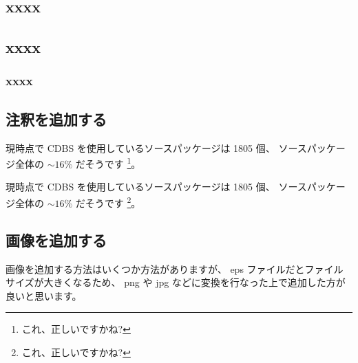 \documentclass[mingoth,a4paper]{jsarticle}
\begin{document}
\begin{commandline}

\subsection{xxxx} %

\subsection{xxxx}

\subsubsection{xxxx} %

\end{commandline}

\subsection{注釈を追加する}

現時点で CDBS を使用しているソースパッケージは 1805 個、
ソースパッケージ全体の $\sim 16 \%$ だそうです
\footnote{これ、正しいですかね? }。

\begin{commandline}
現時点で CDBS を使用しているソースパッケージは 1805 個、
ソースパッケージ全体の $\sim 16 \%$ だそうです
\footnote{これ、正しいですかね? }。
\end{commandline}

\subsection{画像を追加する}
\label{sec:addpicture}

画像を追加する方法はいくつか方法がありますが、
eps ファイルだとファイルサイズが大きくなるため、
png や jpg などに変換を行なった上で追加した方が
良いと思います。

\end{document}
